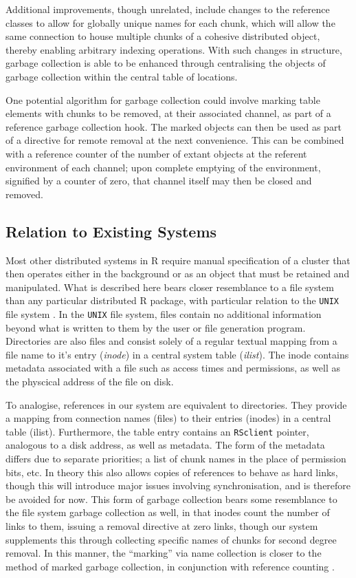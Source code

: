 \documentclass[a4paper]{article}
\begin{document}
Additional improvements, though unrelated, include changes to the reference
classes to allow for globally unique names for each chunk, which will allow the
same connection to house multiple chunks of a cohesive distributed object,
thereby enabling arbitrary indexing operations.
With such changes in structure, garbage collection is able to be enhanced
through centralising the objects of garbage collection within the central table
of locations.

One potential algorithm for garbage collection could involve marking table
elements with chunks to be removed, at their associated channel, as part of a
reference garbage collection hook.
The marked objects can then be used as part of a directive for remote removal
at the next convenience.
This can be combined with a reference counter of the number of extant objects
at the referent environment of each channel; upon complete emptying of the
environment, signified by a counter of zero, that channel itself may then be
closed and removed.

\subsection{Relation to Existing Systems}
\label{localrel}
Most other distributed systems in R require manual specification of a cluster
that then operates either in the background or as an object that must be
retained and manipulated.
What is described here bears closer resemblance to a file system than any
particular distributed R package, with particular relation to the \texttt{UNIX}
file system \cite{ritchie1979evolution} \cite{thompson1974unix}.
In the \texttt{UNIX} file system, files contain no additional information
beyond what is written to them by the user or file generation program.
Directories are also files and consist solely of a regular textual mapping from
a file name to it's entry (\textit{inode}) in a central system table
(\textit{ilist}).
The inode contains metadata associated with a file such as access times and
permissions, as well as the physcical address of the file on disk.

To analogise, references in our system are equivalent to directories.
They provide a mapping from connection names (files) to their entries (inodes)
in a central table (ilist).
Furthermore, the table entry contains an \texttt{RSclient} pointer, analogous
to a disk address, as well as metadata.
The form of the metadata differs due to separate priorities; a list of chunk
names in the place of permission bits, etc.
In theory this also allows copies of references to behave as hard links, though
this will introduce major issues involving synchronisation, and is therefore be
avoided for now.
This form of garbage collection bears some resemblance to the file system
garbage collection as well, in that inodes count the number of links to them,
issuing a removal directive at zero links, though our system supplements this
through collecting specific names of chunks for second degree removal.
In this manner, the ``marking'' via name collection is closer to the method of
marked garbage collection, in conjunction with reference counting
\cite{knuth1}.
\end{document}
